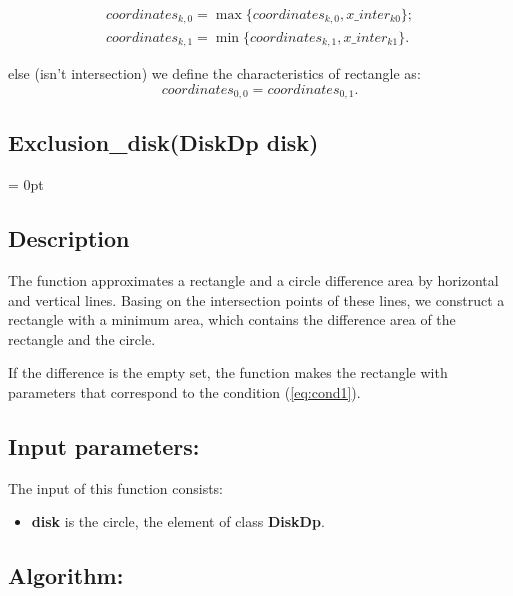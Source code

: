 \documentclass{report}
\begin{document}
		\begin{equation}
		\begin{gathered}
			coordinates_{k,0} = \max\{coordinates_{k,0}, x\_inter_{k0}\};\\
			coordinates_{k,1} = \min\{coordinates_{k,1},x\_inter_{k1}\}.
		\end{gathered}
		\end{equation}
	
		else (isn't intersection) we define the characteristics of rectangle as:
		\begin{equation}
			coordinates_{0,0} = coordinates_{0,1}.
			\label{eq:empty}
		\end{equation}
	
	\label{Difference}
	\begin{center} 
	\section*{Exclusion\_disk(DiskDp disk)}
	\end{center}
	\parindent = 0pt
	\subsection*{Description}

	The function approximates a rectangle and a circle difference area by horizontal and vertical lines. Basing on the intersection points of these lines, we construct a rectangle with a minimum area, which contains the difference area of the rectangle and the circle.

	If the difference is the empty set, the function makes the rectangle with parameters that correspond to the condition (\ref{eq:cond1}).

	\subsection*{Input parameters:}

	The input of this function consists:
	\begin{itemize}	
		\item {\bfseries disk}  is the circle, the element of class {\bfseries DiskDp}. 
	\end{itemize}
	\subsection*{Algorithm:}
\end{document}
